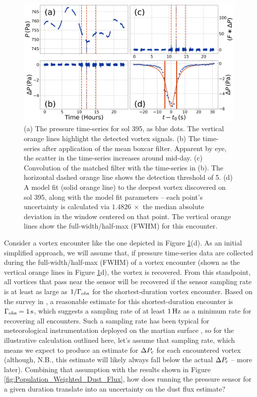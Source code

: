\begin{figure}
    \centering
    \includegraphics[width=\textwidth]{figures/conditioned_data_sol82.png}
    \caption{(a) The pressure time-series for sol 395, as blue dots. The vertical orange lines highlight the detected vortex signals. (b) The time-series after application of the mean boxcar filter. Apparent by eye, the scatter in the time-series increases around mid-day. (c) Convolution of the matched filter with the time-series in (b). The horizontal dashed orange line shows the detection threshold of 5. (d) A model fit (solid orange line) to the deepest vortex discovered on sol 395, along with the model fit parameters -- each point's uncertainty is calculated via $1.4826\ \times$ the median absolute deviation in the window centered on that point. The vertical orange lines show the full-width/half-max (FWHM) for this encounter.}
    \label{fig:data_conditioning_and_fit}
\end{figure}

Consider a vortex encounter like the one depicted in Figure \ref{fig:data_conditioning_and_fit}(d). As an initial simplified approach, we will assume that, if pressure time-series data are collected during the full-width/half-max (FWHM) of a vortex encounter (shown as the vertical orange lines in Figure \ref{fig:data_conditioning_and_fit}d), the vortex is recovered. From this standpoint, all vortices that pass near the sensor will be recovered if the sensor sampling rate is at least as large as $1/\Gamma_{\rm obs}$ for the shortest-duration vortex encounter. Based on the survey in \citet{2022PSJ.....3...20J}, a reasonable estimate for this shortest-duration encounter is $\Gamma_{\rm obs} = 1\,{\rm s}$, which suggests a sampling rate of at least $1\,{\rm Hz}$ as a minimum rate for recovering all encounters. Such a sampling rate has been typical for meteorological instrumentation deployed on the martian surface \citep[e.g.,][]{Spiga2021}, so for the illustrative calculation outlined here, let's assume that sampling rate, which means we expect to produce an estimate for $\Delta P_{\rm c}$ for each encountered vortex (although, N.B., this estimate will likely always fall below the actual $\Delta P_{\rm c}$ -- more later). Combining that assumption with the results shown in Figure \ref{fig:Population_Weighted_Dust_Flux}, how does running the pressure sensor for a given duration translate into an uncertainty on the dust flux estimate?

